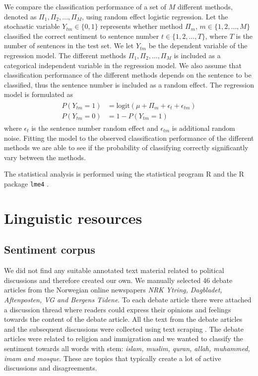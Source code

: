 \documentclass[11pt]{article}
\begin{document}
We compare the classification performance of a set of $M$ different methods, denoted as $\Pi_1, \Pi_2, \ldots, \Pi_M$, using random effect logistic regression. Let the stochastic variable $Y_{tm} \in \{0,1\}$ represents whether method $\Pi_m, \, m \in \{1,2,\ldots,M\}$ classified the correct sentiment to sentence number $t \in \{1,2,\ldots,T\}$, where $T$ is the number of sentences in the test set. We let $Y_{tm}$ be the dependent variable of the regression model. The different methods $\Pi_1, \Pi_2, \ldots, \Pi_M$ is included as a categorical independent variable in the regression model. We also assume that classification performance of the different methods depends on the sentence to be classified, thus the sentence number is included as a random effect. The regression model is formulated as
\begin{align}
  \label{eq:5}
  \begin{split}
    P(Y_{tm} = 1) &= \text{logit}(\mu + \Pi_m + \epsilon_t + \epsilon_{tm}) \\
    P(Y_{tm} = 0) &= 1 - P(Y_{tm} = 1)
  \end{split}
 \end{align}
where $\epsilon_t$ is the sentence number random effect and $\epsilon_{tm}$ is additional random noise. Fitting the model to the observed classification performance of the different methods we are able to see if the probability of classifying correctly significantly vary between the methods.

The statistical analysis is performed using the statistical program R \cite{R} and the R package \verb|lme4| \cite{lme4}.


\section{Linguistic resources}
\label{sec:results}

\subsection{Sentiment corpus}

We did not find any suitable annotated text material related to political discussions and therefore created our own. We manually selected 46 debate articles from the Norwegian online newspapers \textit{NRK Ytring, Dagbladet, Aftenposten, VG and Bergens Tidene}. To each debate article there were attached a discussion thread where readers could express their opinions and feelings towards the content of the debate article. All the text from the debate articles and the subsequent discussions were collected using text scraping \cite{Hammer13}. The debate articles were related to religion and immigration and we wanted to classify the sentiment towards all words with stem: \textit{islam, muslim, quran, allah, muhammed, imam and mosque}. These are topics that typically create a lot of active discussions and disagreements.
\end{document}
